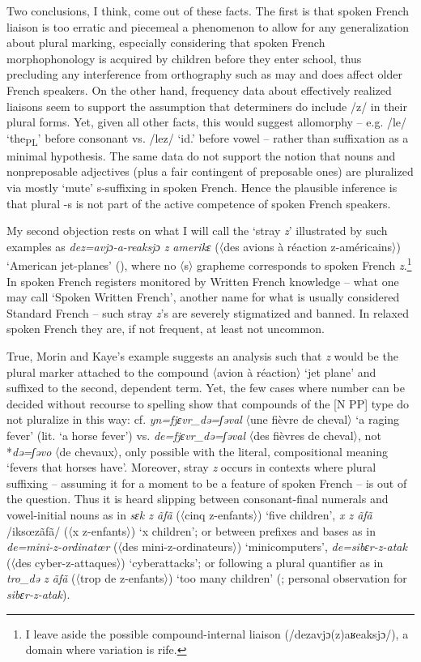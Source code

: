 \documentclass[output=paper]{langscibook}
\begin{document}
Two conclusions, I think, come out of these facts. The first is that spoken French liaison is too erratic and piecemeal a phenomenon to allow for any generalization about plural marking, especially considering that spoken French morphophonology is acquired by children before they enter school, thus precluding any interference from orthography such as may and does affect older French speakers. On the other hand, frequency data about effectively realized liaisons seem to support the assumption that determiners do include /z/ in their plural forms. Yet, given all other facts, this would suggest allomorphy -- e.g. /le/ ‘the\textsubscript{PL}’ before consonant vs. /lez/ ‘id.’ before vowel -- rather than suffixation as a minimal hypothesis. The same data do not support the notion that nouns and nonpreposable adjectives (plus a fair contingent of preposable ones) are pluralized via mostly ‘mute’ s-suffixing in spoken French. Hence the plausible inference is that plural -s is not part of the active competence of spoken French speakers.

My second objection rests on what I will call the ‘stray \textit{z}’ illustrated by such examples as \textit{dez=avjɔ-a-reaksjɔ z amerikɛ} (〈des avions à réaction z-américains〉) ‘American jet-planes’ (\cites{Morin2005}[321]{MorinKaye1982}), where no 〈s〉 grapheme corresponds to spoken French \textit{z}.\footnote{I leave aside the possible compound-internal liaison (/dezavjɔ(z)aʁeaksjɔ/), a domain where variation is rife.} In spoken French registers monitored by Written French knowledge -- what one may call ‘Spoken Written French’, another name for what is usually considered Standard French -- such stray \textit{z}’s are severely stigmatized and banned. In relaxed spoken French they are, if not frequent, at least not uncommon.

True, Morin and Kaye’s example suggests an analysis such that \textit{z} would be the plural marker attached to the compound 〈avion à réaction〉 ‘jet plane’ and suffixed to the second, dependent term. Yet, the few cases where number can be decided without recourse to spelling show that compounds of the [N PP] type do not pluralize in this way: cf. \textit{yn=fjɛvr\_də=ʃəval} 〈une fièvre de cheval〉 ‘a raging fever’ (lit. ‘a horse fever’) vs. \textit{de=fjɛvr\_də=ʃəval} 〈des fièvres de cheval〉, not *\textit{də=ʃəvo} 〈de chevaux〉, only possible with the literal, compositional meaning ‘fevers that horses have’. Moreover, stray \textit{z} occurs in contexts where plural suffixing -- assuming it for a moment to be a feature of spoken French -- is out of the question. Thus it is heard slipping between con\-so\-nant-fi\-nal numerals and vowel-initial nouns as in \textit{sɛk z ãfã} (〈cinq z-enfants〉) ‘five children’, \textit{x z ãfã} /iksœzãfã/ (〈x z-enfants〉) ‘x children’; or between prefixes and bases as in \textit{de=mini-z-ordinatœr} (〈des mini-z-ordinateurs〉) ‘minicomputers’, \textit{de=sibɛr-z-atak} (〈des cyber-z-attaques〉) ‘cyberattacks’; or following a plural quantifier as in \textit{tro\_də z ãfã} (〈trop de z-enfants〉) ‘too many children’ (\citealt[323]{MorinKaye1982}; personal observation for \textit{sibɛr-z-atak}).
\end{document}
